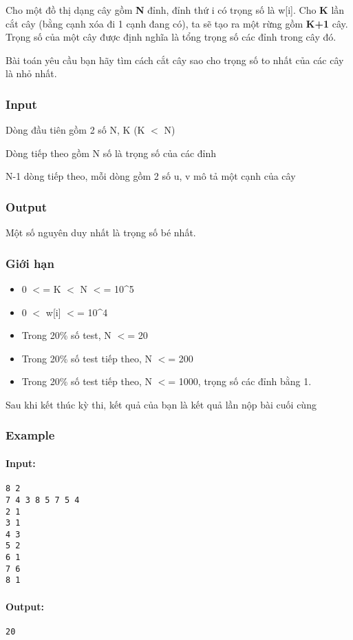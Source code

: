 



   Cho một đồ thị dạng cây gồm   \textbf{    N   }   đỉnh, đỉnh thứ i có trọng số là w[i]. Cho   \textbf{    K   }   lần cắt cây (bằng cạnh xóa đi 1 cạnh đang có), ta sẽ tạo ra một rừng gồm   \textbf{    K+1   }   cây. Trọng số của một cây được định nghĩa là tổng trọng số các đỉnh trong cây đó.  

   Bài toán yêu cầu bạn hãy tìm cách cắt cây sao cho trọng số to nhất của các cây là nhỏ nhất.  

\subsubsection{   Input  }

   Dòng đầu tiên gồm 2 số N, K (K $<$ N)  

   Dòng tiếp theo gồm N số là trọng số của các đỉnh  

   N-1 dòng tiếp theo, mỗi dòng gồm 2 số u, v mô tả một cạnh của cây  

\subsubsection{   Output  }

   Một số nguyên duy nhất là trọng số bé nhất.  

\subsubsection{   Giới hạn  }
\begin{itemize}
	\item     0 $<$= K $<$ N $<$= 10\textasciicircum5   
	\item     0 $<$ w[i] $<$= 10\textasciicircum4   
	\item     Trong 20\% số test, N $<$= 20   
	\item     Trong 20\% số test tiếp theo, N $<$= 200   
	\item     Trong 20\% số test tiếp theo, N $<$= 1000, trọng số các đỉnh bằng 1.   
\end{itemize}

    Sau khi kết thúc kỳ thi, kết quả của bạn là kết quả lần nộp bài cuối cùng   

\textbf{}

\subsubsection{\textbf{    Example   }}

\paragraph{   Input:  }
\begin{verbatim}
8 2
7 4 3 8 5 7 5 4
2 1
3 1
4 3
5 2
6 1
7 6
8 1\end{verbatim}

\paragraph{   Output:  }
\begin{verbatim}
20\end{verbatim}